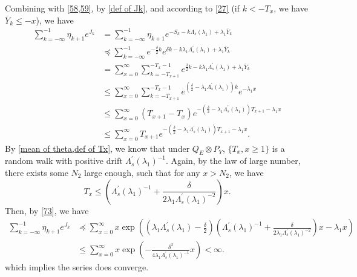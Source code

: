 \documentclass[]{article}
\makeatletter
\numberwithin{equation}{section}
\renewenvironment{proof}[1][\proofname]{%
	\par\pushQED{\qed}\normalfont%
	\topsep6\p@\@plus6\p@\relax
	\trivlist\item[\hskip\labelsep\bfseries#1\@addpunct{.}]%
	\ignorespaces
}{%
	\popQED\endtrivlist\@endpefalse
}
\theoremstyle{thmstyleone}%
\theoremstyle{thmstyletwo}%
\theoremstyle{thmstylethree}%
\theoremstyle{thmstylefour}%
\theoremstyle{thmstylefive}%
\theoremstyle{thmstylesix}%
\makeatother
\begin{document}
\begin{proof}[Proof of \Cref{Lemma of Strongly}]
		Combining with \cref{58,59}, by \cref{def of Jk}, and according to \cref{27} (if $k<-T_x$, we have $\overline{Y}_{k}\leqslant-x$), we have
		\begin{align}
			\sum_{k=-\infty}^{-1} \eta_{k+1} e^{J_k}
			&=
			\sum_{k=-\infty}^{-1} \eta_{k+1} e^{-S_k-k\Lambda_s(\lambda_1)+\lambda_1\overline{Y}_k}
			\nonumber\\
			&\preccurlyeq
			\sum_{k=-\infty}^{-1} e^{-\frac{\delta}{2}k} e^{\delta k-k\lambda_1\Lambda^\prime_s(\lambda_1)+\lambda_1\overline{Y}_k}
			\nonumber\\
			&=\sum_{x=0}^{\infty} 
			\sum_{k=-T_{x+1}}^{-T_{x}-1}  e^{\frac{\delta}{2} k-k\lambda_1\Lambda^\prime_s(\lambda_1)+\lambda_1\overline{Y}_k}
			\nonumber\\
			&\leqslant
			\sum_{x=0}^{\infty} 
			\sum_{k=-T_{x+1}}^{-T_{x}-1} e^{(\frac{\delta}{2}-\lambda_1\Lambda^\prime_s(\lambda_1))k} e^{-\lambda_1 x}
			\nonumber\\
			&\leqslant\sum_{x=0}^{\infty} (T_{x+1}-T_x)e^{-(\frac{\delta}{2}-\lambda_1\Lambda_s^\prime(\lambda_1))T_{x+1}-\lambda_1 x}
			\nonumber\\
			&\leqslant\sum_{x=0}^{\infty} T_{x+1} e^{-(\frac{\delta}{2}-\lambda_1\Lambda_s^\prime(\lambda_1))T_{x+1}-\lambda_1 x}.\label{73}
		\end{align}
		By \cref{mean of theta,def of Tx}, we know that under $Q_E\otimes P_{\overline{Y}}$, $\{T_x,x\geqslant 1\}$ is a random walk with positive drift $\Lambda_s^\prime(\lambda_1)^{-1}$. Again, by the law of large number,
		there exists some $N_2$ large enough, such that for any $x>N_2$, we have
		\begin{equation}
			T_x \leqslant \left(\Lambda_s^\prime(\lambda_1)^{-1}+ \frac{\delta}{2\lambda_1 \Lambda_s^\prime(\lambda_1)^{-2}}\right)x.
		\end{equation}
		Then, by \cref{73}, we have
		\begin{align}
			\sum_{k=-\infty}^{-1} \eta_{k+1} e^{J_k}
			&\preccurlyeq \sum_{x=0}^{\infty}  x \exp\left(
			\left(\lambda_1\Lambda_s^\prime(\lambda_1)-\frac{\delta}{2}\right)\left(
			\Lambda_s^\prime(\lambda_1)^{-1}+ \frac{\delta}{2\lambda_1 \Lambda_s^\prime(\lambda_1)^{-2}}
			\right)x-\lambda_1 x
			\right)
			\nonumber\\
			&\leqslant
			\sum_{x=0}^{\infty} x\exp\left(
			-\frac{\delta^2}{4\lambda_1 \Lambda_s^\prime(\lambda_1)^{-1}}x
			\right) <\infty.
		\end{align}
		which implies the series does converge.
		

\end{proof}
\end{document}
